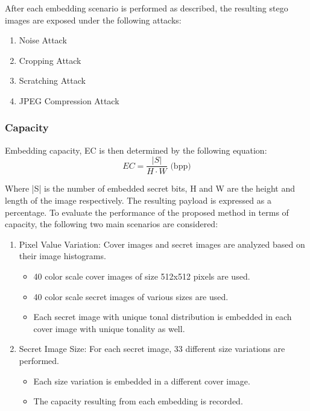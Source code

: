 \documentclass{ittelkom}
\begin{document}
After each embedding scenario is performed as described, the resulting stego
images are exposed under the following attacks:

\begin{enumerate}
    \item Noise Attack
    \item Cropping Attack
    \item Scratching Attack
    \item JPEG Compression Attack
\end{enumerate}

\subsubsection{Capacity}

Embedding capacity, EC is then determined by the following equation:
\begin{equation}
    EC = \frac{|S|}{H \cdot W} \text{ (bpp)}
\end{equation}

Where |S| is the number of embedded secret bits, H and W are the height and
length of the image respectively. The resulting payload is expressed as a
percentage. To evaluate the performance of the proposed method in terms of
capacity, the following two main scenarios are considered:

\begin{enumerate}
    \item Pixel Value Variation: Cover images and secret images are analyzed based on
          their image histograms.
          \begin{itemize}
              \item 40 color scale cover images of size 512x512 pixels are used.
              \item 40 color scale secret images of various sizes are used.
              \item Each secret image with unique tonal distribution is embedded in each cover
                    image with unique tonality as well.
          \end{itemize}
    \item Secret Image Size: For each secret image, 33 different size variations are
          performed.
          \begin{itemize}
              \item Each size variation is embedded in a different cover image.
              \item The capacity resulting from each embedding is recorded.
          \end{itemize}
\end{enumerate}
\end{document}

